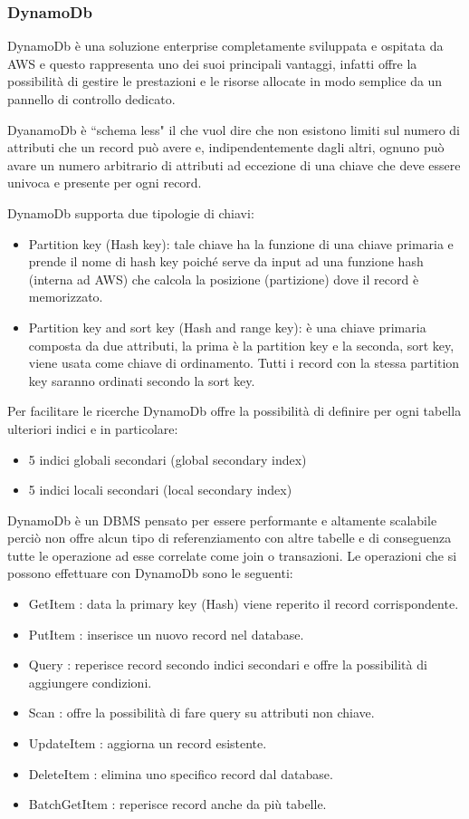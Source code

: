 \subsubsection*{DynamoDb}
DynamoDb è una soluzione enterprise completamente sviluppata e ospitata da AWS e questo rappresenta uno dei suoi principali vantaggi, infatti offre la possibilità di gestire le prestazioni e le risorse allocate in modo semplice da un pannello di controllo dedicato. 

DyanamoDb è ``schema less" il che vuol dire che non esistono limiti sul numero di attributi che un record può avere e, indipendentemente dagli altri, ognuno può avare un numero arbitrario di attributi ad eccezione di una chiave che deve essere univoca e presente per ogni record. 

DynamoDb supporta due tipologie di chiavi:
\begin{itemize}
	\item Partition key (Hash key): tale chiave ha la funzione di una chiave primaria e prende il nome di hash key poiché serve da input ad una funzione hash (interna ad AWS) che calcola la posizione (partizione) dove il record è memorizzato.

	\item Partition key and sort key (Hash and range key): è una chiave primaria composta da due attributi, la prima è la partition key e la seconda, sort key, viene usata come chiave di ordinamento. 
	Tutti i record con la stessa partition key saranno ordinati secondo la sort key. 
\end{itemize}

 Per facilitare le ricerche DynamoDb offre la possibilità di definire per ogni tabella ulteriori indici e in particolare:

\begin{itemize}
	\item 5 indici globali secondari (global secondary index)
	\item 5 indici locali secondari (local secondary index)
\end{itemize}
DynamoDb è un DBMS pensato per essere performante e altamente scalabile perciò non offre alcun tipo di referenziamento con altre tabelle e di conseguenza tutte le operazione ad esse correlate come join o transazioni.
Le operazioni che si possono effettuare con DynamoDb sono le seguenti:
\begin{itemize}
	\item GetItem : data la primary key (Hash) viene reperito il record corrispondente.
	\item PutItem : inserisce un nuovo record nel database.
	\item Query : reperisce record secondo indici secondari e offre la possibilità di aggiungere condizioni.
	\item Scan : offre la possibilità di fare query su attributi non chiave.
	\item UpdateItem : aggiorna un record esistente.
	\item DeleteItem : elimina uno specifico record dal database.
	\item BatchGetItem : reperisce record anche da più tabelle.
\end{itemize}  

